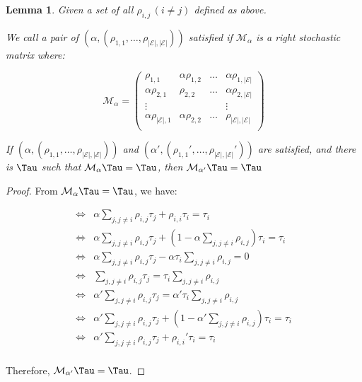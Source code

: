 \documentclass[
  a4paper, xcolor = usenames,dvipsnames]{article}
\newtheorem*{lemma*}{Lemma}
\theoremstyle{definition}
\theoremstyle{definition}
\theoremstyle{definition}
\theoremstyle{definition}
\theoremstyle{remark}
\begin{document}
\begin{lemma*}
Given a set of all $\rho_{i, j} \, (i \neq j)$ defined as above.

We call a pair of $(\alpha, (\rho_{1, 1}, \dots, \rho_{|\mathcal{E}|, |\mathcal{E}|}))$ satisfied if $\mathcal{M}_{\alpha}$ is a right stochastic matrix where:

$$
\mathcal{M}_{\alpha} = \begin{pmatrix}
\rho_{1, 1} & \alpha \rho_{1, 2} & \dots & \alpha \rho_{1, |\mathcal{E}|} \\
\alpha \rho_{2, 1} & \rho_{2, 2} & \dots & \alpha \rho_{2, |\mathcal{E}|} \\
\vdots & & & \vdots \\
\alpha \rho_{|\mathcal{E}|, 1} & \alpha \rho_{2, 2} & \dots & \rho_{|\mathcal{E}|, |\mathcal{E}|} \\
\end{pmatrix}
$$

If $(\alpha, (\rho_{1, 1}, \dots, \rho_{|\mathcal{E}|, |\mathcal{E}|}))$ and $(\alpha', (\rho_{1, 1}', \dots, \rho_{|\mathcal{E}|, |\mathcal{E}|}'))$ are satisfied, and there is $\Tau$ such that $\mathcal{M}_{\alpha} \Tau = \Tau$, then $\mathcal{M}_{\alpha'} \Tau = \Tau$
\end{lemma*}

\begin{proof}
From $\mathcal{M}_{\alpha} \Tau = \Tau$, we have:

\begin{align*}
\iff & \alpha \sum_{j, j \neq i} \rho_{i, j} \tau_{j} + \rho_{i, i} \tau_{i} = \tau_{i} \\
\iff & \alpha \sum_{j, j \neq i} \rho_{i, j} \tau_{j} + (1 - \alpha \sum_{j, j \neq i} \rho_{i, j}) \tau_{i} = \tau_{i} \\
\iff & \alpha \sum_{j, j \neq i} \rho_{i, j} \tau_{j} - \alpha \tau_{i} \sum_{j, j \neq i} \rho_{i, j} = 0 \\
\iff & \sum_{j, j \neq i} \rho_{i, j} \tau_{j} = \tau_{i} \sum_{j, j \neq i} \rho_{i, j} \\
\iff & \alpha' \sum_{j, j \neq i} \rho_{i, j} \tau_{j} = \alpha' \tau_{i} \sum_{j, j \neq i} \rho_{i, j} \\
\iff & \alpha' \sum_{j, j \neq i} \rho_{i, j} \tau_{j} + (1 - \alpha' \sum_{j, j \neq i} \rho_{i, j}) \tau_{i} = \tau_{i} \\
\iff & \alpha' \sum_{j, j \neq i} \rho_{i, j} \tau_{j} + \rho_{i, i}' \tau_{i} = \tau_{i} \\
\end{align*}

Therefore, $\mathcal{M}_{\alpha'} \Tau = \Tau$.
\end{proof}
\end{document}
